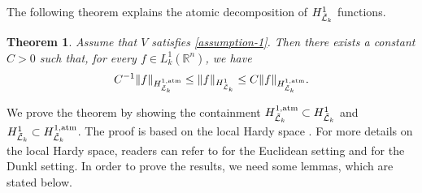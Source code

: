 \documentclass[11pt, reqno]{amsproc}
\newtheorem{theorem}{Theorem}[section]
\theoremstyle{definition}
\theoremstyle{remark}
\numberwithin{equation}{section}
\begin{document}
The following theorem explains the atomic decomposition of $H_{\Tilde{\mathcal{L}}_k}^1$ functions.

\begin{theorem} \label{atomic decomposition} Assume that $V$ satisfies \eqref{assumption-1}. Then there exists a constant $C>0$ such that, for every $f\in L_k^1(\mathbb{R}^n)$, we have
\begin{align*}
C^{-1}\|f\|_{H_{\Tilde{\mathcal{L}}_k}^{1,\text{atm}}} \leq \|f\|_{H_{\Tilde{\mathcal{L}}_k}^1} \leq C\|f\|_{H_{\Tilde{\mathcal{L}}_k}^{1,\text{atm}}}. 
\end{align*}
\end{theorem}
We prove the theorem by showing the containment $H_{\Tilde{\mathcal{L}}_k}^{1,\text{atm}} \subset H_{\Tilde{\mathcal{L}}_k}^1$ and $ H_{\Tilde{\mathcal{L}}_k}^1 \subset  H_{\Tilde{\mathcal{L}}_k}^{1,\text{atm}}$. The proof is based on the local Hardy space \cite{Dziubanski-1999, Jacek-2004}. For more details on the local Hardy space, readers can refer to \cite{Goldberg} for the Euclidean setting and \cite{Hejna-2020} for the Dunkl setting.
In order to prove the results, we need some lemmas, which are stated below. 
\end{document}
